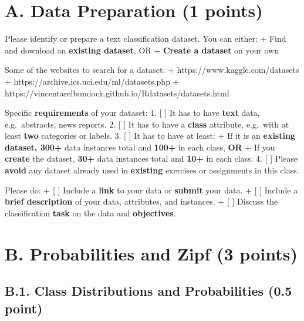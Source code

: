 \documentclass[
  letterpaper,
]{scrbook}
\begin{document}
\section*{A. Data Preparation (1
points)}\label{a.-data-preparation-1-points}


Please identify or prepare a text classification dataset. You can
either: + Find and download an \textbf{existing dataset}, OR +
\textbf{Create a dataset} on your own

Some of the websites to search for a dataset: +
https://www.kaggle.com/datasets +
https://archive.ics.uci.edu/ml/datasets.php +
https://vincentarelbundock.github.io/Rdatasets/datasets.html

Specific \textbf{requirements} of your dataset: 1. {[} {]} It has to
have \textbf{text} data, e.g.~abstracts, news reports. 2. {[} {]} It has
to have a \textbf{class} attribute, e.g.~with at least \textbf{two}
categories or labels. 3. {[} {]} It has to have at least: + If it is an
\textbf{existing dataset, 300+} data instances total and \textbf{100+}
in each class, \textbf{OR} + If you \textbf{create} the dataset,
\textbf{30+} data instances total and \textbf{10+} in each class. 4. {[}
{]} Please \textbf{avoid} any dataset already used in \textbf{existing}
exercises or assignments in this class.

Please do: + {[} {]} Include a \textbf{link} to your data or
\textbf{submit} your data. + {[} {]} Include a \textbf{brief
description} of your data, attributes, and instances. + {[} {]} Discuss
the classification \textbf{task} on the data and \textbf{objectives}.

\section*{B. Probabilities and Zipf (3
points)}\label{b.-probabilities-and-zipf-3-points}


\subsection*{B.1. Class Distributions and Probabilities (0.5
point)}\label{b.1.-class-distributions-and-probabilities-0.5-point}
\end{document}
